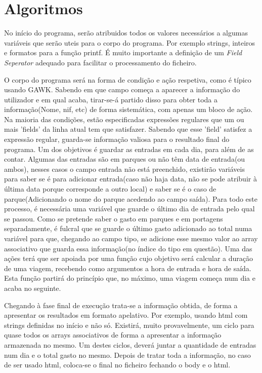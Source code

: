 \documentclass{report}
\def\fs{\emph{Field Seperator}\xspace}
\begin{document}
\section{Algoritmos}
No início do programa, serão atribuidos todos os valores necessários a algumas variáveis que serão uteis para o corpo do programa.
Por exemplo strings, inteiros e formatos para a função printf.
É muito importante a definição de um \fs adequado para facilitar o processamento do ficheiro.\par
O corpo do programa será na forma de condição e ação respetiva, como é típico usando GAWK.
Sabendo em que campo começa a aparecer a informação do utilizador e em qual acaba, tirar-se-á partido disso para obter toda a 
informação(Nome, nif, etc) de forma sistemática, com apenas um bloco de ação.
Na maioria das condições, estão especificadas expressões regulares que um ou mais 'fields' da linha atual tem que satisfazer. 
Sabendo que esse 'field' satisfez a expressão regular, guarda-se informação valiosa para o resultado final do programa. Um dos objetivos é guardar as entradas em cada dia, para além de as contar.
Algumas das entradas são em parques ou não têm data de entrada(ou ambos), nesses casos o campo entrada não
está preenchido, existirão variáveis para saber se é para adicionar entrada(caso não haja data, não se pode atribuir à última data porque corresponde a outro local) e saber se é o caso de parque(Adicionando o nome do 
parque acedendo ao campo saída). Para todo este processo, é necessária uma variável que guarde o último dia de entrada pelo qual se passou.
Como se pretende saber o gasto em parques e em portagens separadamente, é 
fulcral que se guarde o último gasto adicionado ao total numa variável para que, chegando ao campo tipo, se adicione esse mesmo valor 
ao array associativo que guarda essa informação(no índice do tipo em questão).
Uma das ações terá que ser apoiada por uma
função cujo objetivo será calcular a duração de uma viagem, recebendo como
argumentos a hora de entrada e hora de saída. Esta função partirá do 
princípio que, no máximo, uma viagem começa num dia e acaba no seguinte.
\par
Chegando à fase final de execução trata-se a informação obtida, de forma a apresentar os resultados em formato apelativo. Por exemplo, 
usando html com strings definidas no início e não só. Existirá, muito provavelmente, 
um ciclo para quase todos os arrays associativos de forma a apresentar a informação 
armazenada no mesmo. Um destes ciclos, deverá juntar a quantidade de entradas num dia e o total gasto no mesmo.
Depois de tratar toda a informação, no caso de ser usado html, coloca-se o final no ficheiro fechando o body e o html. 
\end{document}
